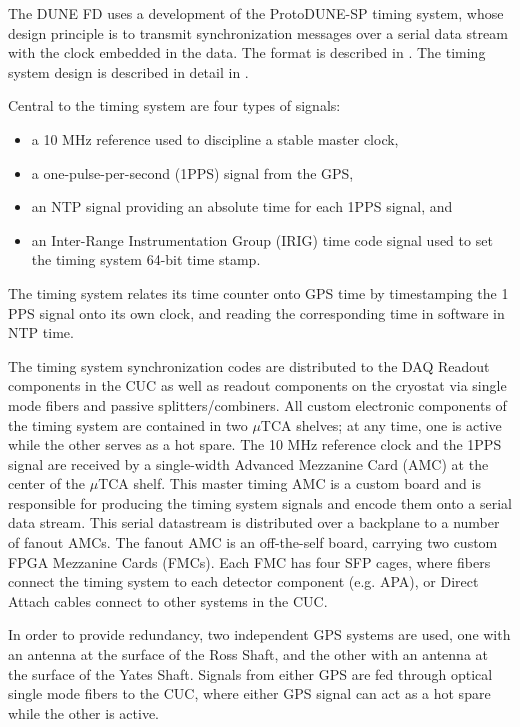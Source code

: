The DUNE FD uses a development of the ProtoDUNE-SP timing
system, whose design principle is to transmit synchronization messages over
a serial data stream with the clock embedded in the data. The format
is described in \cite{docid-1651}. The timing system design is
described in detail in \cite{docid-11233}.

Central to the timing system are four types of signals:
\begin{itemize}
\item a 10 MHz reference used to discipline a stable master clock,
\item a one-pulse-per-second (1PPS) signal from the GPS,
\item an NTP signal providing an absolute time for each 1PPS signal, and
\item an Inter-Range Instrumentation Group (IRIG) time code signal
  used to set the timing system 64-bit time stamp.
\end{itemize}
The timing system relates its time counter onto GPS time by
timestamping the 1 PPS signal onto its own clock, and reading
the corresponding time in software in NTP time.

The timing system synchronization codes are distributed to the DAQ
Readout components in the CUC as well as readout components on the
cryostat via single mode fibers and passive splitters/combiners. All
custom electronic components of the timing system are contained in two
$\mu$TCA shelves; at any time, one is active while the other serves as
a hot spare. The 10 MHz reference clock and the 1PPS signal
are received by a single-width Advanced Mezzanine Card (AMC) at the
center of the $\mu$TCA shelf. This master timing AMC is a custom board
and is responsible for producing the timing system signals and encode them onto
a serial data stream. This serial datastream is distributed over a backplane to 
a number of fanout AMCs. The fanout AMC is an off-the-self board,
carrying two custom FPGA Mezzanine Cards (FMCs). Each FMC has four SFP
cages, where fibers connect the timing system to each detector
component (e.g. APA), or Direct Attach cables connect
to other systems in the CUC.

In order to provide redundancy, two independent GPS systems are used,
one with an antenna at the surface of the Ross Shaft, and the other
with an antenna at the surface of the Yates Shaft. Signals from either
GPS are fed through optical single mode fibers to the CUC, where
either GPS signal can act as a hot spare while the other is active. 

